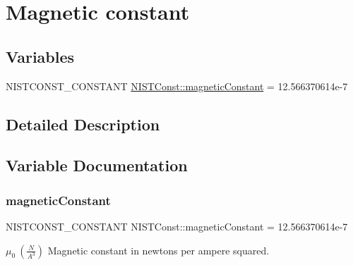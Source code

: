 \hypertarget{group___n_i_s_t_const-_magnetic_constant}{}\section{Magnetic constant}
\label{group___n_i_s_t_const-_magnetic_constant}
\subsection*{Variables}
\begin{DoxyCompactItemize}
\item 
N\+I\+S\+T\+C\+O\+N\+S\+T\+\_\+\+C\+O\+N\+S\+T\+A\+NT \mbox{\hyperlink{group___n_i_s_t_const-_magnetic_constant_gae78bada05f4e3438f6197ca595d9d09b}{N\+I\+S\+T\+Const\+::magnetic\+Constant}} = 12.\+566370614e-\/7
\end{DoxyCompactItemize}


\subsection{Detailed Description}


\subsection{Variable Documentation}
\mbox{\label{group___n_i_s_t_const-_magnetic_constant_gae78bada05f4e3438f6197ca595d9d09b}} 
\subsubsection{\texorpdfstring{magnetic\+Constant}{magneticConstant}}
{\footnotesize\ttfamily N\+I\+S\+T\+C\+O\+N\+S\+T\+\_\+\+C\+O\+N\+S\+T\+A\+NT N\+I\+S\+T\+Const\+::magnetic\+Constant = 12.\+566370614e-\/7}

$\mu_0 \ (\frac{N}{A^3})$ Magnetic constant in newtons per ampere squared. 